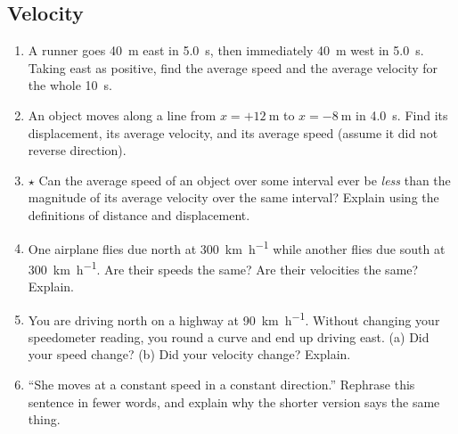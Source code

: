 \documentclass[11pt,twoside,openany]{book}
\begin{document}
\subsection*{Velocity}
\begin{enumerate}[label=\textbf{\thechapter.\arabic*},resume=exercises,leftmargin=*]
  \item A runner goes \SI{40}{\metre} east in \SI{5.0}{\second}, then immediately \SI{40}{\metre} west in \SI{5.0}{\second}. Taking east as positive, find the average speed and the average velocity for the whole \SI{10}{\second}.
  \item An object moves along a line from $x = +\SI{12}{\metre}$ to $x = \SI{-8}{\metre}$ in \SI{4.0}{\second}. Find its displacement, its average velocity, and its average speed (assume it did not reverse direction).
  \item $\star$ Can the average speed of an object over some interval ever be \emph{less} than the magnitude of its average velocity over the same interval? Explain using the definitions of distance and displacement.
  \item One airplane flies due north at \SI{300}{\kilo\metre\per\hour} while another flies due south at \SI{300}{\kilo\metre\per\hour}. Are their speeds the same? Are their velocities the same? Explain.
  \item You are driving north on a highway at \SI{90}{\kilo\metre\per\hour}. Without changing your speedometer reading, you round a curve and end up driving east. (a) Did your speed change? (b) Did your velocity change? Explain.
  \item ``She moves at a constant speed in a constant direction.'' Rephrase this sentence in fewer words, and explain why the shorter version says the same thing.
\end{enumerate}
\end{document}
